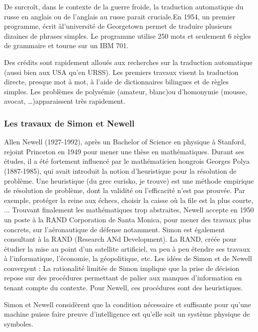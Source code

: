 De surcroît, dans le contexte de la guerre froide, la traduction automatique du russe en anglais ou de l'anglais au russe parait cruciale.En 1954, un premier programme, écrit àl'université de Georgetown permet de traduire plusieurs dizaines de phrases simples. Le programme utilise 250 mots et seulement 6 règles de grammaire et tourne sur un IBM 701.

Des crédits sont rapidement alloués aux recherches sur la traduction automatique (aussi bien aux USA qu'en URSS). Les premiers travaux visent la traduction directe, presque mot à mot, à l'aide de dictionnaires bilingues et de règles simples. Les problèmes de polysémie (amateur, blanc)ou d'homonymie (mousse, avocat, …)apparaissent très rapidement.                      




\subsubsection{Les travaux de Simon et Newell}


Allen Newell (1927-1992), après un Bachelor of Science en physique à Stanford, rejoint Princeton en 1949 pour mener une thèse en mathématiques. Durant ses études, il a été fortement influencé par le mathématicien hongrois Georges Polya (1887-1985), qui avait introduit la notion d'heuristique pour la résolution de problème. Une heuristique (du grec eurisko, je trouve) est une méthode empirique de résolution de problème, dont la validité ou l'efficacité n'est pas prouvée. Par exemple, protéger la reine aux échecs, choisir la caisse où la file est la plus courte, ...
Trouvant finalement les mathématiques trop abstraites, Newell accepte en 1950 un poste à la RAND Corporation de Santa Monica, pour mener des travaux plus concrets, sur l'aéronautique de défense notamment.
Simon est également consultant à la RAND (Research ANd Development). La RAND, créée pour étudier la mise au point d'un satellite artificiel, va peu à peu étendre ses travaux à l'informatique, l'économie, la géopolitique, etc. Les idées de Simon et de Newell convergent : La rationalité limitée de Simon implique que la prise de décision repose sur des procédures permettant de palier aux manques d'information en tenant compte du contexte. Pour Newell, ces procédures sont des heuristiques.

Simon et Newell considèrent que la condition nécessaire et suffisante pour qu'une machine puisse faire preuve d'intelligence est qu'elle soit un système physique de symboles.


